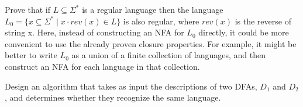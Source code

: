 \documentclass[a4paper]{article}
\begin{document}
\newpage
\begin{prob}
 Prove that if $L \subseteq \Sigma^*$ is a regular language then the language $L_0 = \{x \subseteq \Sigma^* \mid x \cdot rev(x) \in L\}$ is also
regular, where $rev(x)$ is the reverse of string x. Here, instead of constructing an NFA for $L_0$ directly, it
could be more convenient to use the already proven closure properties. For example, it might be better
to write $L_0$ as a union of a finite collection of languages, and then construct an NFA for each language
in that collection.\\
\end{prob}


\newpage
\begin{prob}
Design an algorithm that takes as input the descriptions of two DFAs, $D_1$ and $D_2$, and determines
whether they recognize the same language.
\end{prob}


\end{document}
